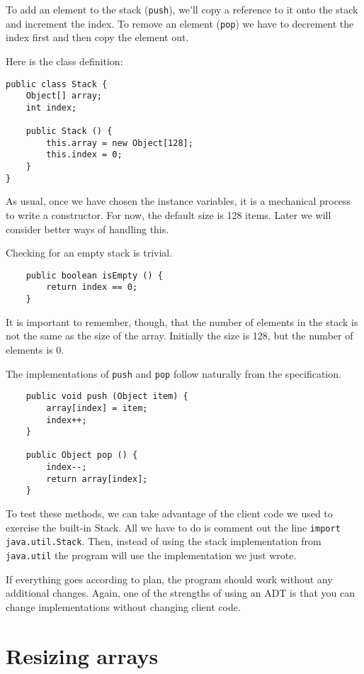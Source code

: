 To add an element to the stack ({\tt push}), we'll copy 
a reference to it onto the stack and increment the index.
To remove an element ({\tt pop}) we have to decrement the
index first and then copy the element out.

Here is the class definition:

\begin{verbatim}
public class Stack {
    Object[] array;
    int index;

    public Stack () {
        this.array = new Object[128];
        this.index = 0;
    }
}
\end{verbatim}
%
As usual, once we have chosen the instance variables, it is
a mechanical process to write a constructor.
For now, the default size is 128 items.  Later we will consider
better ways of handling this.

Checking for an empty stack is trivial.

\begin{verbatim}
    public boolean isEmpty () {
        return index == 0;
    }
\end{verbatim}
%
It is important to remember, though, that the number of elements in
the stack is not the same as the size of the array.  Initially the
size is 128, but the number of elements is 0.

The implementations of {\tt push} and {\tt pop} follow naturally from
the specification.

\begin{verbatim}
    public void push (Object item) {
        array[index] = item;
        index++;
    }

    public Object pop () {
        index--;
        return array[index];
    }
\end{verbatim}
%
To test these methods, we can take advantage of the client code
we used to exercise the built-in Stack.  All we have to do is
comment out the line {\tt import java.util.Stack}.  Then, instead
of using the stack implementation from {\tt java.util} the
program will use the implementation we just wrote.

If everything goes according to plan, the program should
work without any additional changes.  Again, one of the strengths
of using an ADT is that you can change implementations without
changing client code.


\section{Resizing arrays}
\label{resize}

